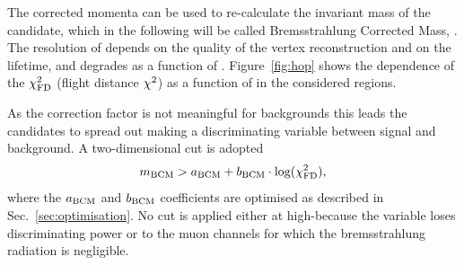 The corrected momenta can be used to re-calculate the invariant mass of the \Bz candidate, which in the following will be
called Bremsstrahlung Corrected Mass, \mbcm. The resolution of \mbcm depends on the quality of the vertex reconstruction
and on the \Bz lifetime, and degrades as a function of \qsq. Figure~\ref{fig:hop} shows the dependence of the \Bz $\chi^2_{\rm FD}$ 
(flight distance $\chi^2$) as a function of \mbcm in the considered \qsq regions. 

As the correction factor is not meaningful for backgrounds this leads the candidates to spread out making \mbcm 
a discriminating variable between signal and background. A two-dimensional cut is adopted
%
$$m_{\rm BCM} > a_{\rm BCM} + b_{\rm BCM} \cdot \log(\chi^2_{\rm FD}),$$
%
where the $a_{\rm BCM}$ and $b_{\rm BCM}$ coefficients are optimised as described in Sec.~\ref{sec:optimisation}.
%
No cut is applied either at high-\qsq because the variable loses discriminating power or to the muon 
channels for which the bremsstrahlung radiation is negligible.




